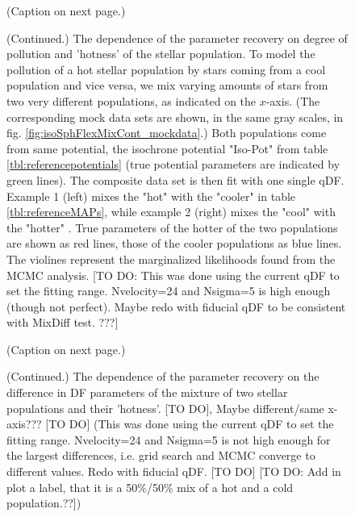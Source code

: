 \begin{figure}
\caption{(Caption on next page.)}
\label{fig:isoSphFlexMixCont}
\end{figure}

\addtocounter{figure}{-1}
\begin{figure} [t!]
  \caption{(Continued.)  The dependence of the parameter recovery on degree of pollution and 'hotness' of the stellar population. To model the pollution of a hot stellar population by stars coming from a cool population and vice versa, we mix varying amounts of stars from two very different populations, as indicated on the $x$-axis. (The corresponding mock data sets are shown, in the same gray scales, in fig. \ref{fig:isoSphFlexMixCont_mockdata}.)  Both populations come from same potential, the isochrone potential "Iso-Pot" from table \ref{tbl:referencepotentials}  (true potential parameters are indicated by green lines). The composite data set is then fit with one single qDF. Example 1 (left) mixes the "hot" \MAP with the "cooler" \MAP in table \ref{tbl:referenceMAPs}, while example 2 (right) mixes the "cool" \MAP with the "hotter" \MAP. True parameters of the hotter of the two populations are shown as red lines, those of the cooler populations as blue lines. The violines represent the marginalized likelihoods found from the MCMC analysis. [TO DO: This was done using the current qDF to set the fitting range. Nvelocity=24 and Nsigma=5 is high enough (though not perfect). Maybe redo with fiducial qDF to be consistent with MixDiff test. ???]}
\end{figure}


\begin{figure}
\caption{(Caption on next page.)}
\label{fig:isoSphFlexMixDiff}
\end{figure}


\addtocounter{figure}{-1}
\begin{figure} [t!]
  \caption{(Continued.) The dependence of the parameter recovery on the difference in DF parameters of the mixture of two stellar populations and their 'hotness'.  [TO DO], Maybe different/same x-axis??? [TO DO] (This was done using the current qDF to set the fitting range. Nvelocity=24 and Nsigma=5 is not high enough for the largest differences, i.e. grid search and MCMC converge to different values. Redo with fiducial qDF. [TO DO] [TO DO: Add in plot a label, that it is a 50\%/50\% mix of a hot and a cold population.??])} 
\end{figure}

